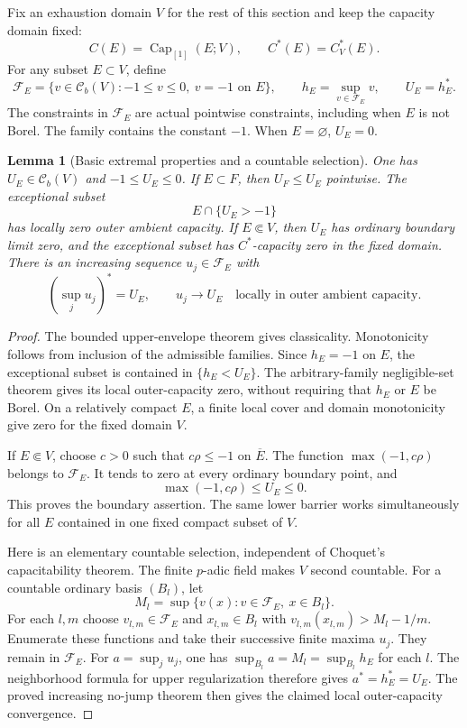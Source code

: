 \documentclass[11pt,a4paper]{article}
\numberwithin{equation}{section}
\newtheorem{lemma}[theorem]{Lemma}
\theoremstyle{definition}
\theoremstyle{remark}
\newcommand{\Cb}{\mathcal C_b}
\begin{document}
Fix an exhaustion domain $V$ for the rest of this section and
keep the capacity domain fixed:
\[
 C(E)=\operatorname{Cap}_{[1]}(E;V),\qquad C^*(E)=C_V^*(E).
\]
For any subset $E\subset V$, define
\[
 \mathcal F_E=\{v\in\Cb(V):-1\leq v\leq0,\ v=-1\text{ on }E\},
 \qquad h_E=\sup_{v\in\mathcal F_E}v,\qquad U_E=h_E^*.
\]
The constraints in $\mathcal F_E$ are actual pointwise
constraints, including when $E$ is not Borel. The family
contains the constant $-1$. When $E=\varnothing$, $U_E=0$.

\begin{lemma}[Basic extremal properties and a countable selection]
\label{lem:r2-extremal-basics}
One has $U_E\in\Cb(V)$ and $-1\leq U_E\leq0$.
If $E\subset F$, then $U_F\leq U_E$ pointwise.
The exceptional subset
\[
 E\cap\{U_E>-1\}
\]
has locally zero outer ambient capacity. If $E\Subset V$,
then $U_E$ has ordinary boundary limit zero, and the
exceptional subset has $C^*$-capacity zero in the fixed domain.
There is an increasing sequence $u_j\in\mathcal F_E$ with
\[
 \left(\sup_j u_j\right)^*=U_E,\qquad
 u_j\longrightarrow U_E
   \quad\text{locally in outer ambient capacity}.
\]
\end{lemma}

\begin{proof}
The bounded upper-envelope theorem gives classicality.
Monotonicity follows from inclusion of the admissible families.
Since $h_E=-1$ on $E$, the exceptional subset is contained
in $\{h_E<U_E\}$. The arbitrary-family negligible-set theorem
gives its local outer-capacity zero, without requiring that
$h_E$ or $E$ be Borel. On a relatively compact $E$, a finite
local cover and domain monotonicity give zero for the fixed
domain $V$.

If $E\Subset V$, choose $c>0$ such that $c\rho\leq-1$ on
$\overline E$. The function $\max(-1,c\rho)$ belongs to
$\mathcal F_E$. It tends to zero at every ordinary boundary
point, and
\[
 \max(-1,c\rho)\leq U_E\leq0.
\]
This proves the boundary assertion. The same lower barrier
works simultaneously for all $E$ contained in one fixed
compact subset of $V$.

Here is an elementary countable selection, independent of
Choquet's capacitability theorem. The finite $p$-adic field
makes $V$ second countable. For a countable ordinary basis
$(B_l)$, let
\[
 M_l=\sup\{v(x):v\in\mathcal F_E,\ x\in B_l\}.
\]
For each $l,m$ choose $v_{l,m}\in\mathcal F_E$ and
$x_{l,m}\in B_l$ with $v_{l,m}(x_{l,m})>M_l-1/m$.
Enumerate these functions and take their successive finite
maxima $u_j$. They remain in $\mathcal F_E$.
For $a=\sup_j u_j$, one has
$\sup_{B_l}a=M_l=\sup_{B_l}h_E$ for each $l$.
The neighborhood formula for upper regularization therefore
gives $a^*=h_E^*=U_E$. The proved increasing no-jump theorem
then gives the claimed local outer-capacity convergence.
\end{proof}
\end{document}
